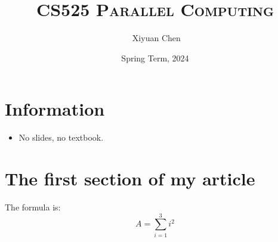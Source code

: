 \documentclass{../../ainote}
\author{\ccLogo \,\,Xiyuan Chen}
\title{\textsc{CS525 Parallel Computing}}
\date{Spring Term, 2024}
\begin{document}
\maketitle
\doclicenseThis
\section*{Information}
\begin{itemize}
	\item No slides, no textbook.
\end{itemize}
\tableofcontents
\newpage

\section{The first section of my article}
\begin{info}
    The formula is: 
    \begin{equation}
    \label{eqa:1}
        A=\sum_{i=1}^3 i^2
    \end{equation}
\end{info}
\end{document}
